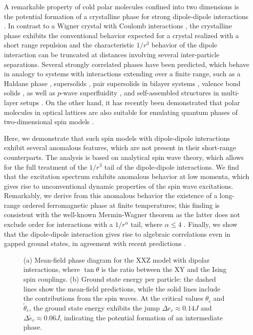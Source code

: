 A remarkable property of cold polar molecules confined into two dimensions is the potential formation
of a crystalline phase for strong dipole-dipole interactions \cite{Buchler2007,Astrakharchik2007}. In contrast to a Wigner crystal with Coulomb
interactions \cite{Bonsall1977}, the crystalline phase exhibits the conventional behavior expected for a crystal realized with a
short range repulsion and the characteristic $1/r^3$ behavior of the dipole interaction can be truncated
at distances involving several inter-particle separations. Several strongly correlated phases have been predicted, which
behave in analogy to systems with interactions extending over a finite range, such as a Haldane phase \cite{DallaTorre2006a}, supersolids \cite{Pollet2010,Capogrosso-Sansone2010}, pair supersolids in
bilayer systems \cite{Trefzger2009}, valence bond solids \cite{Bonnes2010},
as well as $p$-wave superfluidity \cite{Cooper2009}, and self-assembled structures in multi-layer setups \cite{Wang2006}.
%
On the other hand, it has recently been demonstrated that polar molecules in optical
lattices are also suitable for emulating quantum phases of two-dimensional spin models \cite{Micheli2006,Gorshkov2011,Gorshkov2011c}.

Here, we demonstrate that such spin models with dipole-dipole interactions exhibit several anomalous features,
which are not present in their short-range counterparts. The analysis is based on analytical spin wave theory, which
allows for the full treatment of the $1/r^3$ tail of the dipole-dipole interactions. We find that the excitation spectrum
exhibits anomalous behavior at low momenta, which gives rise to unconventional dynamic properties of the spin wave excitations.
Remarkably, we derive from this anomalous behavior the existence of a long-range ordered ferromagnetic phase at finite temperatures;
this finding is consistent with the well-known Mermin-Wagner theorem as the latter does not exclude order
for interactions with a $1/r^\alpha$ tail, where $\alpha \le 4$ \cite{Mermin1966,Bruno2001,DeSousa2005}. Finally, we show that the dipole-dipole interaction gives rise to
algebraic correlations even in gapped ground states, in agreement with recent predictions \cite{Deng2005,Schuch2006}.





\begin{figure}[ht]
    \centering
    \caption{(a) Mean-field phase diagram for the XXZ model with dipolar interactions, where $\tan \theta$ is the ratio between the XY and the Ising spin couplings. (b) Ground state energy per particle: the dashed lines show the mean-field predictions, while the solid lines include the contributions from the spin waves. At the critical values $\theta_{c}$ and $\tilde{\theta}_{c}$, the ground state energy exhibits the jump $\Delta e_{c}\approx 0.14J$ and $\Delta \tilde{e}_{c}\approx 0.06J$, indicating the potential formation of an intermediate phase.}
\end{figure}

